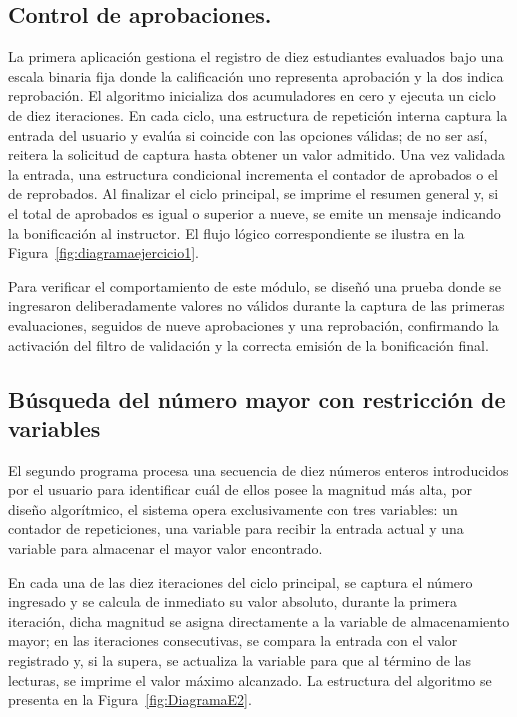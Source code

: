 \subsection{Control de aprobaciones.}
La primera aplicación gestiona el registro de diez estudiantes evaluados bajo una escala binaria fija donde la calificación uno representa aprobación y la dos indica reprobación. El algoritmo inicializa dos acumuladores en cero y ejecuta un ciclo de diez iteraciones. En cada ciclo, una estructura de repetición interna captura la entrada del usuario y evalúa si coincide con las opciones válidas; de no ser así, reitera la solicitud de captura hasta obtener un valor admitido. Una vez validada la entrada, una estructura condicional incrementa el contador de aprobados o el de reprobados. Al finalizar el ciclo principal, se imprime el resumen general y, si el total de aprobados es igual o superior a nueve, se emite un mensaje indicando la bonificación al instructor. El flujo lógico correspondiente se ilustra en la Figura~\ref{fig:diagramaejercicio1}.

Para verificar el comportamiento de este módulo, se diseñó una prueba donde se ingresaron deliberadamente valores no válidos durante la captura de las primeras evaluaciones, seguidos de nueve aprobaciones y una reprobación, confirmando la activación del filtro de validación y la correcta emisión de la bonificación final.


\clearpage

\subsection{Búsqueda del número mayor con restricción de variables}
El segundo programa procesa una secuencia de diez números enteros introducidos por el usuario para identificar cuál de ellos posee la magnitud más alta, por diseño algorítmico, el sistema opera exclusivamente con tres variables: un contador de repeticiones, una variable para recibir la entrada actual y una variable para almacenar el mayor valor encontrado. 

En cada una de las diez iteraciones del ciclo principal, se captura el número ingresado y se calcula de inmediato su valor absoluto, durante la primera iteración, dicha magnitud se asigna directamente a la variable de almacenamiento mayor; en las iteraciones consecutivas, se compara la entrada con el valor registrado y, si la supera, se actualiza la variable para que al término de las lecturas, se imprime el valor máximo alcanzado. 
La estructura del algoritmo se presenta en la Figura~\ref{fig:DiagramaE2}.

